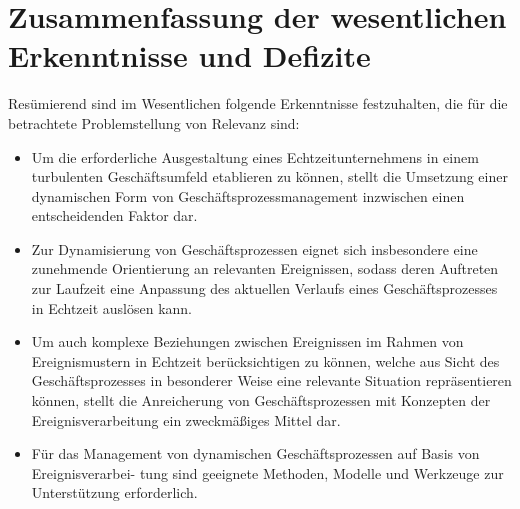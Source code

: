 \section{Zusammenfassung der wesentlichen Erkenntnisse und Defizite}\label{sec:grundlagensummary}

Resümierend sind im Wesentlichen folgende Erkenntnisse festzuhalten, die für die betrachtete Problemstellung von Relevanz sind:
\begin{itemize}
	\item 
	Um die erforderliche Ausgestaltung eines Echtzeitunternehmens in einem turbulenten Geschäftsumfeld etablieren zu können, stellt die Umsetzung einer dynamischen Form von Geschäftsprozessmanagement inzwischen einen entscheidenden Faktor dar.
    \item 
    Zur Dynamisierung von Geschäftsprozessen eignet sich insbesondere eine zunehmende Orientierung an relevanten Ereignissen, sodass deren Auftreten zur Laufzeit eine Anpassung des aktuellen Verlaufs eines Geschäftsprozesses in Echtzeit auslösen kann.
    \item
    Um auch komplexe Beziehungen zwischen Ereignissen im Rahmen von Ereignismustern in Echtzeit berücksichtigen zu können, welche aus Sicht des Geschäftsprozesses in besonderer Weise eine relevante Situation repräsentieren können, stellt die Anreicherung von Geschäftsprozessen mit Konzepten der Ereignisverarbeitung ein zweckmäßiges Mittel dar.
    \item
    Für das Management von dynamischen Geschäftsprozessen auf Basis von Ereignisverarbei- tung sind geeignete Methoden, Modelle und Werkzeuge zur Unterstützung erforderlich.
\end{itemize}

